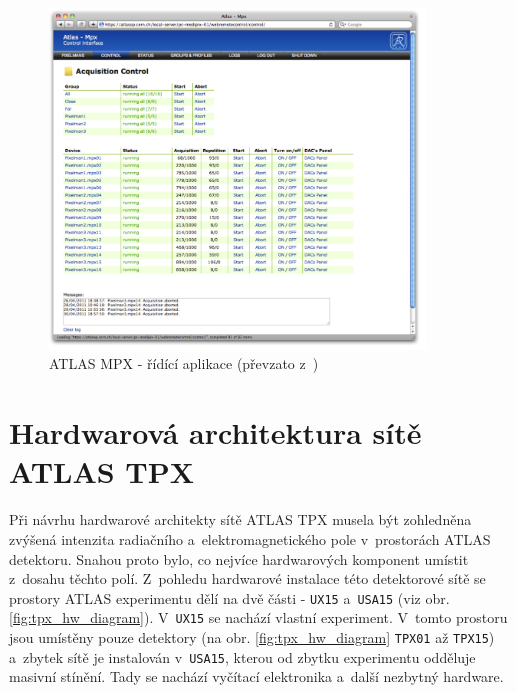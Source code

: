 \begin{figure}[ht]
	\begin{center}
		\includegraphics[width=10cm]{figures/mpx_web.png}
		\caption{ATLAS MPX - řídící aplikace (převzato z~\cite{TurecekThesis2011})}
		\label{fig:mpx_web}
	\end{center}
\end{figure}

\section{Hardwarová architektura sítě ATLAS TPX}\label{atlas:hw_arch}
Při návrhu hardwarové architekty sítě ATLAS TPX musela být zohledněna zvýšená intenzita radiačního a~elektromagnetického pole v~prostorách ATLAS detektoru. Snahou proto bylo, co nejvíce hardwarových komponent umístit z~dosahu těchto polí. Z~pohledu hardwarové instalace této detektorové sítě se prostory ATLAS experimentu dělí na dvě části - \texttt{UX15} a~\texttt{USA15} (viz obr. \ref{fig:tpx_hw_diagram}). V~\texttt{UX15} se nachází vlastní experiment. V~tomto prostoru jsou umístěny pouze detektory (na obr. \ref{fig:tpx_hw_diagram} \texttt{TPX01} až \texttt{TPX15}) a~zbytek sítě je instalován v~\texttt{USA15}, kterou od zbytku experimentu odděluje masivní stínění. Tady se nachází vyčítací elektronika a~další nezbytný hardware.

